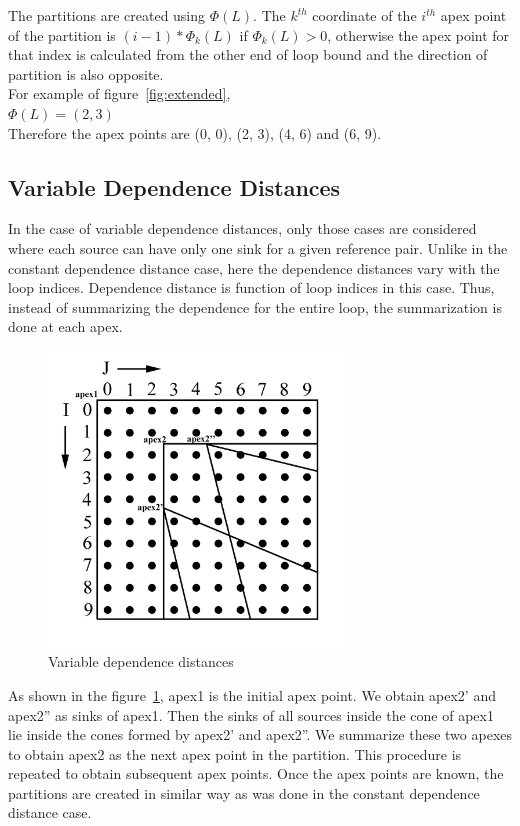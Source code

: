 The partitions are created using $\Phi(L)$. The $k^{th}$ coordinate of the $i^{th}$ apex point of the partition is $(i-1)*\Phi_k(L)$ if $\Phi_k(L) > 0$, otherwise the apex point for that index is calculated from the other end of loop bound and the direction of partition is also opposite. \\

For example of figure~\ref{fig:extended}, \\
$\Phi(L) = (2, 3)$ \\
Therefore the apex points are (0, 0), (2, 3), (4, 6) and (6, 9). \\

\subsection{Variable Dependence Distances}

In the case of variable dependence distances, only those cases are considered where each source can have only one sink for a given reference pair. Unlike in the constant dependence distance case, here the dependence distances vary with the loop indices. Dependence distance is function of loop indices in this case. Thus, instead of summarizing the dependence for the entire loop, the summarization is done at each apex. \\

\begin{figure}
\caption{Variable dependence distances}
\label{fig:variable1}
\centering \includegraphics[width=0.7\textwidth]{Figures/variable1.jpg}
\end{figure}

As shown in the figure~\ref{fig:variable1}, apex1 is the initial apex point. We obtain apex2' and apex2'' as sinks of apex1. Then the sinks of all sources inside the cone of apex1 lie inside the cones formed by apex2' and apex2''. We summarize these two apexes to obtain apex2 as the next apex point in the partition. This procedure is repeated to obtain subsequent apex points. Once the apex points are known, the partitions are created in similar way as was done in the constant dependence distance case. \\



